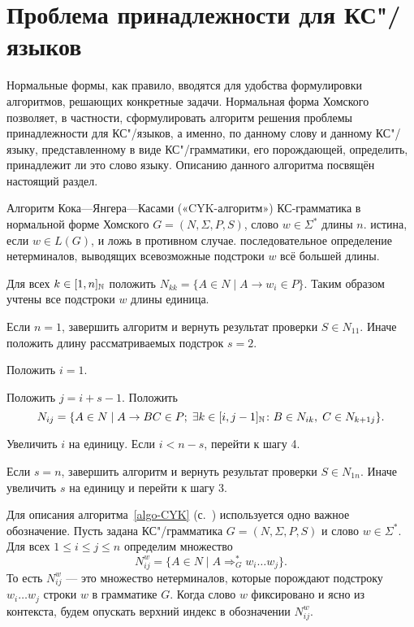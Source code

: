 \section{Проблема принадлежности для КС"/языков}
\label{Chapter7ProblemB}

Нормальные формы, как правило, вводятся для удобства формулировки
алгоритмов, решающих конкретные задачи. Нормальная форма Хомского
позволяет, в частности, сформулировать алгоритм решения проблемы
принадлежности для КС"/языков, а именно, по данному слову и данному
КС"/языку, представленному в виде КС"/грамматики, его порождающей,
определить, принадлежит ли это слово языку. Описанию данного алгоритма 
посвящён настоящий раздел.

\Algo
{Алгоритм Кока—Янгера—Касами («CYK-алгоритм»)}
{\label{algo-CYK}КС-грамматика в нормальной форме Хомского $G=(N,\Sigma,P,S)$,
слово $w\in \Sigma^*$ длины $n$.}
{истина, если $w \in L(G)$, и ложь в противном случае.}
{последовательное определение нетерминалов, выводящих
всевозможные подстроки $w$ всё большей длины.}
{
\item Для всех $k\in [1,n]_{\mathbb N}$ положить $N_{kk} = \{ A \in N \mid
    A \to w_i \in P\}$. Таким образом учтены все подстроки $w$ длины
    единица.

\item Если $n=1$, завершить алгоритм и вернуть результат
    проверки $S \in N_{11}$. Иначе положить длину
    рассматриваемых подстрок $s = 2$.

\item Положить $i = 1$.

\item
    Положить $j = i + s - 1$. Положить
    \[
        N_{ij} = \{ A \in N \mid A \to BC \in P; \;
                \exists k \in [i, j-1]_{\mathbb N} \colon B \in N_{ik}, \;
                C \in N_{k+1 j} \}.
    \]

\item Увеличить $i$ на единицу. Если $ i < n - s$, перейти
    к шагу 4.

\item Если $s = n$, завершить алгоритм и вернуть результат
    проверки $S \in N_{1n}$. Иначе увеличить $s$ на единицу и
    перейти к шагу 3.
}

Для описания алгоритма~\ref{algo-CYK} (с.~\pageref{algo-CYK}) используется
одно важное обозначение. Пусть задана
КС"/грамматика $G=(N,\Sigma,P,S)$ и слово $w\in \Sigma^*$.
Для всех $1 \leqslant i \leqslant j \leqslant n$
определим множество
\[
    N_{ij}^w = \{ A \in N \mid A \Rightarrow^*_G w_i \ldots w_j \}.
\]
То есть $N_{ij}^w$ ---  это множество нетерминалов, которые порождают
подстроку $w_i \ldots w_j$ строки $w$ в грамматике $G$. Когда слово
$w$ фиксировано и ясно из контекста, будем опускать верхний индекс
в обозначении $N_{ij}^w$.


